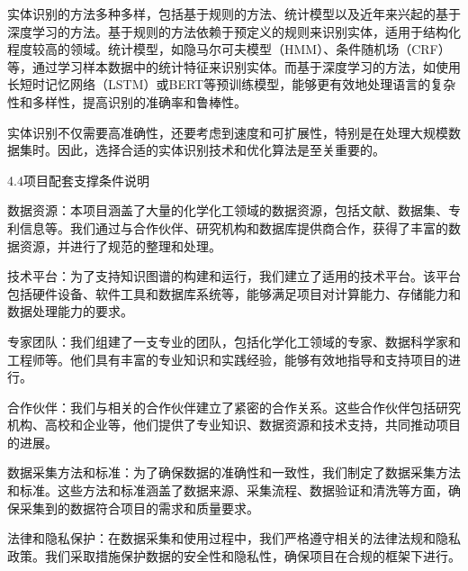 实体识别的方法多种多样，包括基于规则的方法、统计模型以及近年来兴起的基于深度学习的方法。基于规则的方法依赖于预定义的规则来识别实体，适用于结构化程度较高的领域。统计模型，如隐马尔可夫模型（HMM）、条件随机场（CRF）等，通过学习样本数据中的统计特征来识别实体。而基于深度学习的方法，如使用长短时记忆网络（LSTM）或BERT等预训练模型，能够更有效地处理语言的复杂性和多样性，提高识别的准确率和鲁棒性。

实体识别不仅需要高准确性，还要考虑到速度和可扩展性，特别是在处理大规模数据集时。因此，选择合适的实体识别技术和优化算法是至关重要的。



4.4项目配套支撑条件说明

数据资源：本项目涵盖了大量的化学化工领域的数据资源，包括文献、数据集、专利信息等。我们通过与合作伙伴、研究机构和数据库提供商合作，获得了丰富的数据资源，并进行了规范的整理和处理。

技术平台：为了支持知识图谱的构建和运行，我们建立了适用的技术平台。该平台包括硬件设备、软件工具和数据库系统等，能够满足项目对计算能力、存储能力和数据处理能力的要求。

专家团队：我们组建了一支专业的团队，包括化学化工领域的专家、数据科学家和工程师等。他们具有丰富的专业知识和实践经验，能够有效地指导和支持项目的进行。

合作伙伴：我们与相关的合作伙伴建立了紧密的合作关系。这些合作伙伴包括研究机构、高校和企业等，他们提供了专业知识、数据资源和技术支持，共同推动项目的进展。

数据采集方法和标准：为了确保数据的准确性和一致性，我们制定了数据采集方法和标准。这些方法和标准涵盖了数据来源、采集流程、数据验证和清洗等方面，确保采集到的数据符合项目的需求和质量要求。

法律和隐私保护：在数据采集和使用过程中，我们严格遵守相关的法律法规和隐私政策。我们采取措施保护数据的安全性和隐私性，确保项目在合规的框架下进行。
